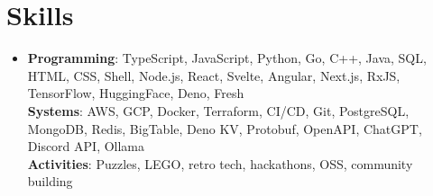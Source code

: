 \documentclass[letterpaper,11pt]{article}
\newcommand{\resumeItem}[1]{
  \item\small{
    {#1 \vspace{-2pt}}
  }
}
\begin{document}
\section{Skills}
\begin{itemize}[leftmargin=0.15in, label={}]
    \resumeItem{
      \textbf{Programming}{: TypeScript, JavaScript, Python, Go, C++, Java, SQL, HTML, CSS, Shell, Node.js, React, Svelte, Angular, Next.js, RxJS, TensorFlow, HuggingFace, Deno, Fresh} \\
      \textbf{Systems}{: AWS, GCP, Docker, Terraform, CI/CD, Git, PostgreSQL, MongoDB, Redis, BigTable, Deno KV, Protobuf, OpenAPI, ChatGPT, Discord API, Ollama} \\
      \textbf{Activities}{: Puzzles, LEGO, retro tech, hackathons, OSS, community building}
    }
 \end{itemize}

\end{document}
